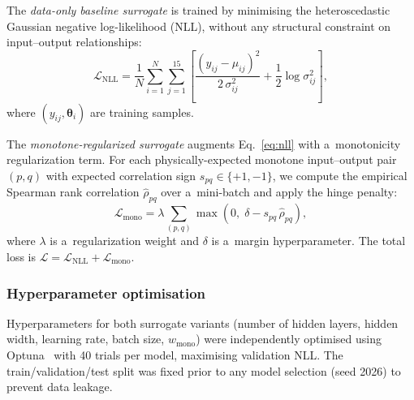 \documentclass[pdflatex,sn-mathphys-num]{sn-jnl}
\theoremstyle{thmstyleone}
\theoremstyle{thmstyletwo}
\theoremstyle{thmstylethree}
\begin{document}
The \textit{data-only baseline surrogate} is trained by minimising the
heteroscedastic Gaussian negative log-likelihood (NLL), without any structural
constraint on input--output relationships:
\begin{equation}
  \mathcal{L}_{\mathrm{NLL}} = \frac{1}{N}\sum_{i=1}^{N}\sum_{j=1}^{15}
  \left[
    \frac{(y_{ij} - \mu_{ij})^2}{2\,\sigma_{ij}^2}
    + \frac{1}{2}\log\sigma_{ij}^2
  \right],
  \label{eq:nll}
\end{equation}
where $(y_{ij}, \bm{\theta}_i)$ are training samples.

The \textit{monotone-regularized surrogate} augments
Eq.~\eqref{eq:nll} with a~monotonicity regularization term.
For each physically-expected monotone input--output pair $(p, q)$ with expected
correlation sign $s_{pq} \in \{+1, -1\}$, we compute the empirical Spearman rank
correlation $\hat{\rho}_{pq}$ over a~mini-batch and apply the hinge penalty:
\begin{equation}
  \mathcal{L}_{\mathrm{mono}} = \lambda \sum_{(p,q)} \max\!\left(0,\; \delta - s_{pq}\,\hat{\rho}_{pq}\right),
  \label{eq:mono}
\end{equation}
where $\lambda$ is a~regularization weight and $\delta$ is a~margin hyperparameter.
The total loss is $\mathcal{L} = \mathcal{L}_{\mathrm{NLL}} + \mathcal{L}_{\mathrm{mono}}$.

\subsubsection{Hyperparameter optimisation}

Hyperparameters for both surrogate variants (number of hidden layers, hidden
width, learning rate, batch size, $w_{\mathrm{mono}}$) were independently optimised
using Optuna~\cite{ref:optuna} with 40 trials per model, maximising validation NLL.
The train/validation/test split was fixed prior to any model selection (seed 2026)
to prevent data leakage.
\end{document}
